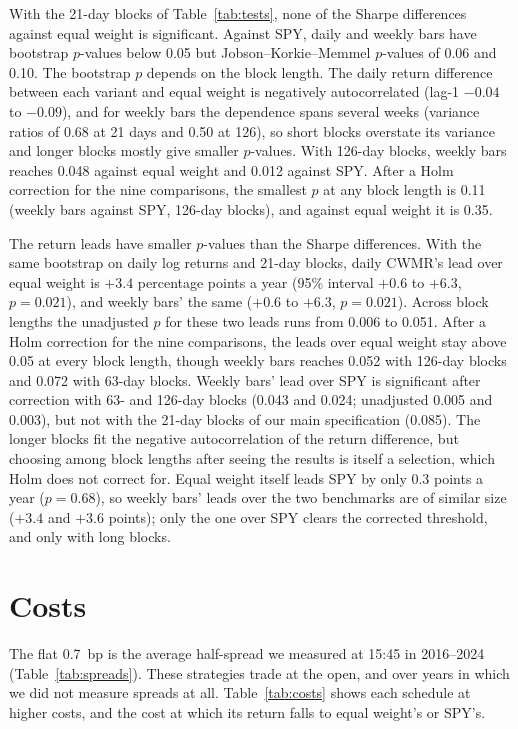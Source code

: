 \documentclass[11pt]{article}
\begin{document}
With the 21-day blocks of Table~\ref{tab:tests}, none of the Sharpe differences against equal
weight is significant.
Against SPY, daily and weekly bars have bootstrap $p$-values below 0.05 but Jobson--Korkie--Memmel
$p$-values of 0.06 and 0.10. The bootstrap $p$ depends on the block length. The daily return
difference between each variant and equal weight is negatively autocorrelated (lag-1 $-0.04$ to
$-0.09$), and for weekly bars the dependence spans several weeks (variance ratios of 0.68 at 21
days and 0.50 at 126), so short blocks overstate its variance and longer blocks mostly give
smaller $p$-values. With 126-day
blocks, weekly bars reaches 0.048 against equal weight and 0.012 against SPY. After a Holm
correction for the nine comparisons, the smallest $p$ at any block length is 0.11 (weekly bars
against SPY, 126-day blocks), and against equal weight it is 0.35.

The return leads have smaller $p$-values than the Sharpe differences. With the same bootstrap on daily log returns
and 21-day blocks, daily CWMR's lead over equal weight is $+3.4$ percentage points a year (95\%
interval $+0.6$ to $+6.3$, $p = 0.021$), and weekly bars' the same ($+0.6$ to $+6.3$,
$p = 0.021$). Across block lengths the unadjusted $p$ for these two leads runs from 0.006 to
0.051. After a Holm correction for the nine comparisons, the leads over equal weight stay above
0.05 at every block length, though weekly bars reaches 0.052 with 126-day blocks and 0.072 with
63-day blocks. Weekly bars' lead over SPY is significant after correction with 63- and 126-day
blocks (0.043 and 0.024; unadjusted 0.005 and 0.003), but not with the 21-day blocks of our main
specification (0.085). The longer blocks fit the negative autocorrelation of the return
difference, but choosing among block lengths after seeing the results is itself a selection,
which Holm does not correct for. Equal weight itself leads SPY by only 0.3 points a year ($p = 0.68$),
so weekly bars' leads over the two benchmarks are of similar size ($+3.4$ and $+3.6$ points);
only the one over SPY clears the corrected threshold, and only with long blocks.

\section{Costs}\label{sec:costs}

The flat 0.7~bp is the average half-spread we measured at 15:45 in 2016--2024
(Table~\ref{tab:spreads}). These strategies trade at the open, and over years in which we did
not measure spreads at all. Table~\ref{tab:costs} shows each schedule at higher costs, and the
cost at which its return falls to equal weight's or SPY's.
\end{document}
